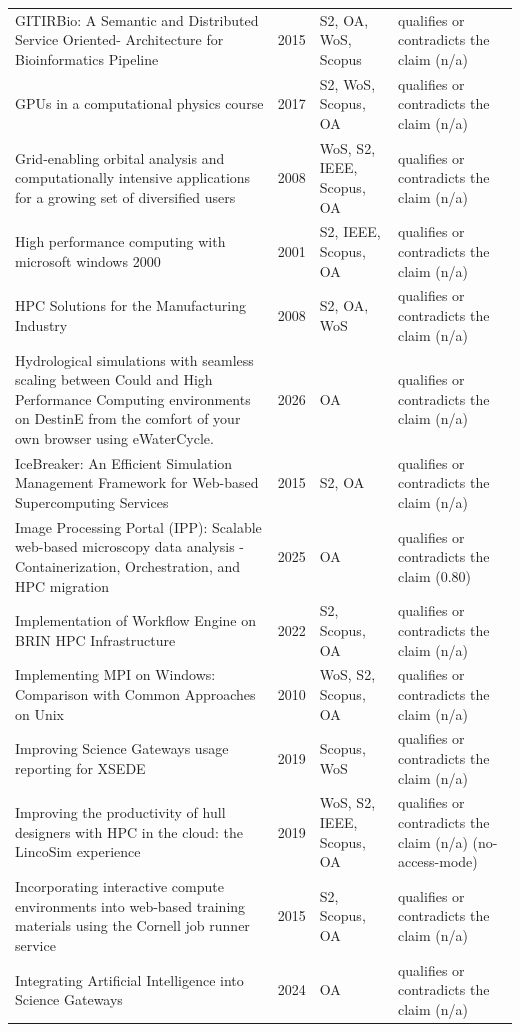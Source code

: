 \begin{longtable}{@{}%
  >{\raggedright\arraybackslash}p{}c%
  >{\raggedright\arraybackslash}p{}%
  >{\raggedright\arraybackslash}p{}@{}}
GITIRBio: A Semantic and Distributed Service Oriented- Architecture for Bioinformatics Pipeline & 2015 & S2, OA, WoS, Scopus & qualifies or contradicts the claim (n/a) \\
GPUs in a computational physics course & 2017 & S2, WoS, Scopus, OA & qualifies or contradicts the claim (n/a) \\
Grid-enabling orbital analysis and computationally intensive applications for a growing set of diversified users & 2008 & WoS, S2, IEEE, Scopus, OA & qualifies or contradicts the claim (n/a) \\
High performance computing with microsoft windows 2000 & 2001 & S2, IEEE, Scopus, OA & qualifies or contradicts the claim (n/a) \\
HPC Solutions for the Manufacturing Industry & 2008 & S2, OA, WoS & qualifies or contradicts the claim (n/a) \\
Hydrological simulations with seamless scaling between Could and High Performance Computing environments on DestinE from the comfort of your own browser using eWaterCycle. & 2026 & OA & qualifies or contradicts the claim (n/a) \\
IceBreaker: An Efficient Simulation Management Framework for Web-based Supercomputing Services & 2015 & S2, OA & qualifies or contradicts the claim (n/a) \\
Image Processing Portal (IPP): Scalable web-based microscopy data analysis - Containerization, Orchestration, and HPC migration & 2025 & OA & qualifies or contradicts the claim (0.80) \\
Implementation of Workflow Engine on BRIN HPC Infrastructure & 2022 & S2, Scopus, OA & qualifies or contradicts the claim (n/a) \\
Implementing MPI on Windows: Comparison with Common Approaches on Unix & 2010 & WoS, S2, Scopus, OA & qualifies or contradicts the claim (n/a) \\
Improving Science Gateways usage reporting for XSEDE & 2019 & Scopus, WoS & qualifies or contradicts the claim (n/a) \\
Improving the productivity of hull designers with HPC in the cloud: the LincoSim experience & 2019 & WoS, S2, IEEE, Scopus, OA & qualifies or contradicts the claim (n/a) (no-access-mode) \\
Incorporating interactive compute environments into web-based training materials using the Cornell job runner service & 2015 & S2, Scopus, OA & qualifies or contradicts the claim (n/a) \\
Integrating Artificial Intelligence into Science Gateways & 2024 & OA & qualifies or contradicts the claim (n/a) \\

\end{longtable}

